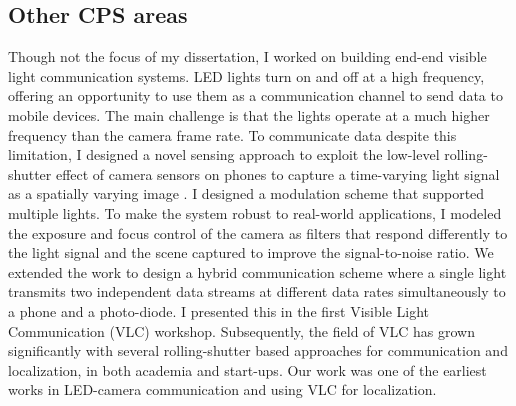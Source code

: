 \documentclass[10pt]{article}
\begin{document}


\subsection{Other CPS areas}
Though not the focus of my dissertation, I worked on building end-end visible light communication systems. 
LED lights turn on and off at a high frequency, offering an opportunity to use them as a communication channel to send data to mobile devices. The main challenge is that the lights operate at a much higher frequency than the camera frame rate.%
To communicate data despite this limitation, I designed a novel
sensing approach to exploit the low-level rolling-shutter effect of camera sensors 
on phones to capture a time-varying light signal as a spatially varying image \cite{rajagopal2014visual, rajagopal2014demonstration}. %
I designed a modulation scheme that supported multiple lights.  
To make the system robust to real-world applications, I modeled the exposure and focus control of the camera as
filters that respond differently to the light signal and the scene
captured to improve the signal-to-noise ratio. %
We extended the work
\cite{rajagopal2014hybrid} to design a hybrid communication scheme
where a single light transmits two independent data streams at
different data rates simultaneously to a phone and a photo-diode. I
presented this in the first Visible Light Communication
(VLC) workshop. Subsequently, the field of
VLC has grown significantly with several rolling-shutter based
approaches for communication and localization, in both academia and
start-ups. Our work was one of the earliest works in LED-camera communication and using VLC for
localization.
\end{document}
